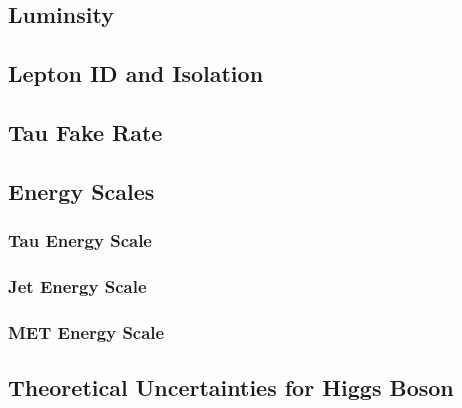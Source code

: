 \subsection{Luminsity}
\subsection{Lepton ID and Isolation}
\subsection{Tau Fake Rate}
\subsection{Energy Scales}
\subsubsection{Tau Energy Scale}
\subsubsection{Jet Energy Scale}
\subsubsection{MET Energy Scale}
\subsection{Theoretical Uncertainties for Higgs Boson}



